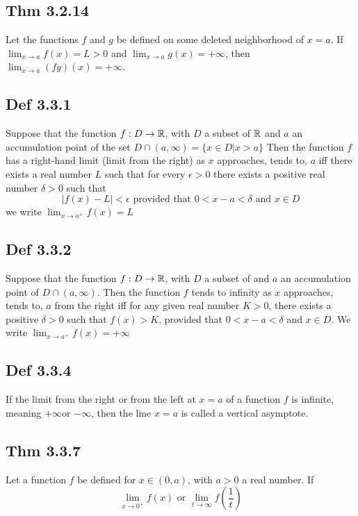 \subsection*{Thm 3.2.14}
    Let the functions $f$ and $g$ be defined on some deleted neighborhood  of $x = a$. If $\lim_{x \to a} f(x) = L > 0$ and $\lim_{x \to a} g(x) = + \infty$, then $\lim_{x \to a} (fg) (x) = + \infty$.

\subsection*{Def 3.3.1}
    Suppose that the function $f : D \to \mathbb{R}$, with $D$ a subset of $\mathbb{R}$ and $a$ an accumulation point of the set $D \cap (a, \infty) = \{x \in  D | x > a \}$ Then the function $f$ has a right-hand limit (limit from the right) as $x$ approaches, tends to, $a$ iff there exists a real number $L$ such that for every $\epsilon > 0$ there exists a positive real number $\delta > 0$ such that
    \[
    |f(x) - L| < \epsilon \text{ provided that } 0 < x - a < \delta \text{ and } x \in D 
    \] 
    we write $ \lim_{x \to a^{+}} f(x) = L$

\subsection*{Def 3.3.2}
Suppose that the function $f : D \to \mathbb{R}$, with $D$ a subset of and $a$ an accumulation point of $D \cap (a, \infty)$. Then the function $f$ tends to infinity as $x$ approaches, tends to, $a$ from the right iff for any given real number $K > 0$, there exists a positive $\delta> 0$ such that $f (x) > K$, provided that $0 < x - a < \delta$ and $x \in D$. We write $\lim_{x \to a^{+}} f(x) = +\infty$

\subsection*{Def 3.3.4}
    If the limit from the right or from the left at $x = a$ of a function $f$ is infinite, meaning $+\infty$or $-\infty$, then the line $x = a$ is called a vertical asymptote.

\subsection*{Thm 3.3.7}
    Let a function $f$ be defined for $x \in (0, a)$, with $a > 0$ a real number. If
    \[
    \lim_{x \to 0^{+}} f(x) \text{ or } \lim_{t \to \infty} f\left( \frac{1}{t} \right)
    \] 

